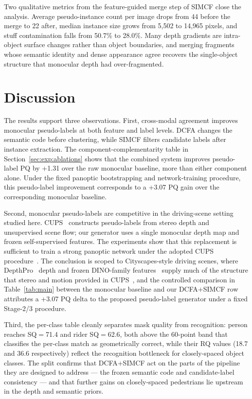\documentclass{article}
\begin{document}
Two qualitative metrics from the feature-guided merge step of SIMCF close the analysis. Average pseudo-instance count per image drops from 44 before the merge to 22 after, median instance size grows from 5{,}502 to 14{,}965 pixels, and stuff contamination falls from 50.7\% to 28.0\%. Many depth gradients are intra-object surface changes rather than object boundaries, and merging fragments whose semantic identity and dense appearance agree recovers the single-object structure that monocular depth had over-fragmented.


\FloatBarrier
\section{Discussion}
\label{sec:discussion}

The results support three observations. First, cross-modal agreement improves monocular pseudo-labels at both feature and label levels. DCFA changes the semantic code before clustering, while SIMCF filters candidate labels after instance extraction. The component-complementarity table in Section~\ref{sec:exp:ablations} shows that the combined system improves pseudo-label PQ by +1.31 over the raw monocular baseline, more than either component alone. Under the fixed panoptic bootstrapping and network-training procedure, this pseudo-label improvement corresponds to a +3.07 PQ gain over the corresponding monocular baseline.

Second, monocular pseudo-labels are competitive in the driving-scene setting studied here. CUPS~\cite{hahn2025cups} constructs pseudo-labels from stereo depth and unsupervised scene flow; our generator uses a single monocular depth map and frozen self-supervised features. The experiments show that this replacement is sufficient to train a strong panoptic network under the adopted CUPS procedure~\cite{hahn2025cups}. The conclusion is scoped to Cityscapes-style driving scenes, where DepthPro~\cite{bochkovskii2024depthpro} depth and frozen DINO-family features~\cite{oquab2024dinov2,simeoni2025dinov3} supply much of the structure that stereo and motion provided in CUPS~\cite{hahn2025cups}, and the controlled comparison in Table~\ref{tab:main} between the monocular baseline and our DCFA$+$SIMCF row attributes a +3.07 PQ delta to the proposed pseudo-label generator under a fixed Stage-2/3 procedure.

Third, the per-class table cleanly separates mask quality from recognition: person reaches SQ$=$71.4 and rider SQ$=$62.6, both above the 60-point band that classifies the per-class match as geometrically correct, while their RQ values (18.7 and 36.6 respectively) reflect the recognition bottleneck for closely-spaced object classes. The split confirms that DCFA+SIMCF act on the parts of the pipeline they are designed to address --- the frozen semantic code and candidate-label consistency --- and that further gains on closely-spaced pedestrians lie upstream in the depth and semantic priors.
\end{document}

